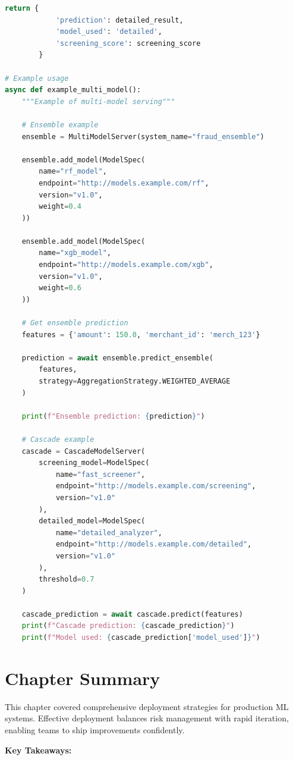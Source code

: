 \begin{lstlisting}[language=Python, caption=Multi-Model Serving Framework]
        return {
            'prediction': detailed_result,
            'model_used': 'detailed',
            'screening_score': screening_score
        }

# Example usage
async def example_multi_model():
    """Example of multi-model serving"""

    # Ensemble example
    ensemble = MultiModelServer(system_name="fraud_ensemble")

    ensemble.add_model(ModelSpec(
        name="rf_model",
        endpoint="http://models.example.com/rf",
        version="v1.0",
        weight=0.4
    ))

    ensemble.add_model(ModelSpec(
        name="xgb_model",
        endpoint="http://models.example.com/xgb",
        version="v1.0",
        weight=0.6
    ))

    # Get ensemble prediction
    features = {'amount': 150.0, 'merchant_id': 'merch_123'}

    prediction = await ensemble.predict_ensemble(
        features,
        strategy=AggregationStrategy.WEIGHTED_AVERAGE
    )

    print(f"Ensemble prediction: {prediction}")

    # Cascade example
    cascade = CascadeModelServer(
        screening_model=ModelSpec(
            name="fast_screener",
            endpoint="http://models.example.com/screening",
            version="v1.0"
        ),
        detailed_model=ModelSpec(
            name="detailed_analyzer",
            endpoint="http://models.example.com/detailed",
            version="v1.0"
        ),
        threshold=0.7
    )

    cascade_prediction = await cascade.predict(features)
    print(f"Cascade prediction: {cascade_prediction}")
    print(f"Model used: {cascade_prediction['model_used']}")
\end{lstlisting}

\section{Chapter Summary}

This chapter covered comprehensive deployment strategies for production ML systems. Effective deployment balances risk management with rapid iteration, enabling teams to ship improvements confidently.

\textbf{Key Takeaways:}

